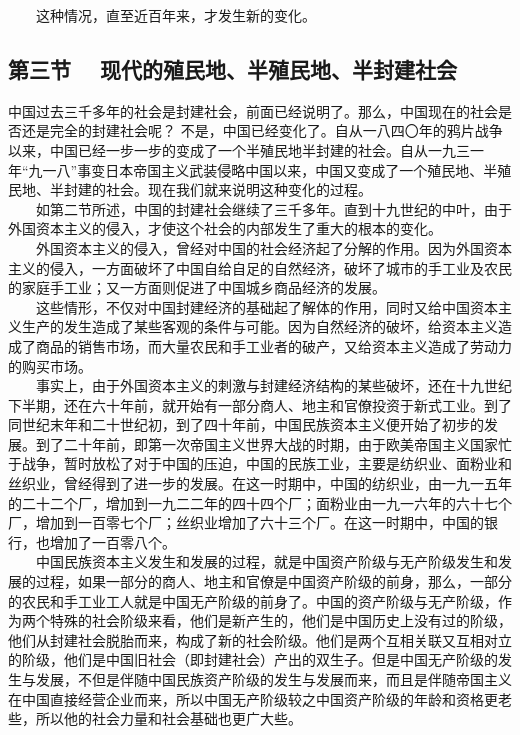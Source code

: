 \documentclass[cn,11pt,chinese]{elegantbook}
\def\myformat#1{\hfil\hfil #1}
\begin{document}
　　这种情况，直至近百年来，才发生新的变化。\\
\subsection*{\myformat{第三节　 现代的殖民地、半殖民地、半封建社会}}
中国过去三千多年的社会是封建社会，前面已经说明了。那么，中国现在的社会是否还是完全的封建社会呢？ 不是，中国已经变化了。自从一八四〇年的鸦片战争以来，中国已经一步一步的变成了一个半殖民地半封建的社会。自从一九三一年“九一八”事变日本帝国主义武装侵略中国以来，中国又变成了一个殖民地、半殖民地、半封建的社会。现在我们就来说明这种变化的过程。\\
　　如第二节所述，中国的封建社会继续了三千多年。直到十九世纪的中叶，由于外国资本主义的侵入，才使这个社会的内部发生了重大的根本的变化。\\
　　外国资本主义的侵入，曾经对中国的社会经济起了分解的作用。因为外国资本主义的侵入，一方面破坏了中国自给自足的自然经济，破坏了城市的手工业及农民的家庭手工业；又一方面则促进了中国城乡商品经济的发展。\\
　　这些情形，不仅对中国封建经济的基础起了解体的作用，同时又给中国资本主义生产的发生造成了某些客观的条件与可能。因为自然经济的破坏，给资本主义造成了商品的销售市场，而大量农民和手工业者的破产，又给资本主义造成了劳动力的购买市场。\\
　　事实上，由于外国资本主义的刺激与封建经济结构的某些破坏，还在十九世纪下半期，还在六十年前，就开始有一部分商人、地主和官僚投资于新式工业。到了同世纪末年和二十世纪初，到了四十年前，中国民族资本主义便开始了初步的发展。到了二十年前，即第一次帝国主义世界大战的时期，由于欧美帝国主义国家忙于战争，暂时放松了对于中国的压迫，中国的民族工业，主要是纺织业、面粉业和丝织业，曾经得到了进一步的发展。在这一时期中，中国的纺织业，由一九一五年的二十二个厂，增加到一九二二年的四十四个厂；面粉业由一九一六年的六十七个厂，增加到一百零七个厂；丝织业增加了六十三个厂。在这一时期中，中国的银行，也增加了一百零八个。\\
　　中国民族资本主义发生和发展的过程，就是中国资产阶级与无产阶级发生和发展的过程，如果一部分的商人、地主和官僚是中国资产阶级的前身，那么，一部分的农民和手工业工人就是中国无产阶级的前身了。中国的资产阶级与无产阶级，作为两个特殊的社会阶级来看，他们是新产生的，他们是中国历史上没有过的阶级，他们从封建社会脱胎而来，构成了新的社会阶级。他们是两个互相关联又互相对立的阶级，他们是中国旧社会（即封建社会）产出的双生子。但是中国无产阶级的发生与发展，不但是伴随中国民族资产阶级的发生与发展而来，而且是伴随帝国主义在中国直接经营企业而来，所以中国无产阶级较之中国资产阶级的年龄和资格更老些，所以他的社会力量和社会基础也更广大些。\\
\end{document}
